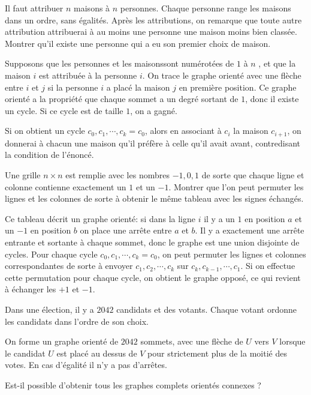 \begin{exo}
Il faut attribuer $n$ maisons à $n$ personnes. Chaque personne range les maisons dans un ordre, sans égalités. Après les attributions, on remarque que toute autre attribution attribuerai à au moins une personne une maison moins bien classée. Montrer qu'il existe une personne qui a eu son premier choix de maison.
\end{exo}

\begin{sol}

Supposons que les personnes  et les maisonssont numérotées de $1$ à $n$ , et que la maison $i$ est attribuée à la personne $i$. On trace le graphe orienté avec une flèche entre $i$ et $j$ si la personne $i$ a placé la maison $j$ en première position. Ce graphe orienté a la propriété que chaque sommet a un degré sortant de $1$, donc il existe un cycle. Si ce cycle est de taille $1$, on a gagné. 

\medskip

Si on obtient un cycle $c_0,c_1,\cdots,c_k=c_0$, alors en associant à $c_i$ la maison $c_{i+1}$, on donnerai à chacun une maison qu'il préfère à celle qu'il avait avant, contredisant la condition de l'énoncé.
\end{sol}

\begin{exo}
Une grille $n\times n$ est remplie avec les nombres $-1,0,1$ de sorte que chaque ligne et colonne contienne exactement un $1$ et un $-1$. Montrer que l'on peut permuter les lignes et les colonnes de sorte à obtenir le même tableau avec les signes échangés. 
\end{exo}

\begin{sol}
Ce tableau décrit un graphe orienté: si dans la ligne $i$ il y a un $1$ en position $a$ et un $-1$ en position $b$ on place une arrête entre $a$ et $b$. Il y a exactement une arrête entrante et sortante à chaque sommet, donc le graphe est une union disjointe de cycles. Pour chaque cycle $c_0,c_1,\cdots,c_k=c_0$, on peut permuter les lignes et colonnes correspondantes de sorte à envoyer $c_1,c_2,\cdots, c_k$ sur $c_k,c_{k-1},\cdots,c_1$. Si on effectue cette permutation pour chaque cycle, on obtient le graphe opposé, ce qui revient à échanger les $+1$ et $-1$.
\end{sol}

\begin{exo}
Dans une élection, il y a $2042$ candidats et des votants. Chaque votant ordonne les candidats dans l'ordre de son choix.

On forme un graphe orienté de $2042$ sommets, avec une flèche de  $U$ vers $V$ lorsque le candidat $U$ est placé au dessus de $V$ pour strictement plus de la moitié des votes. En cas d'égalité il n'y a pas d'arrêtes.

Est-il possible d'obtenir tous les graphes complets orientés connexes ?
\end{exo}

